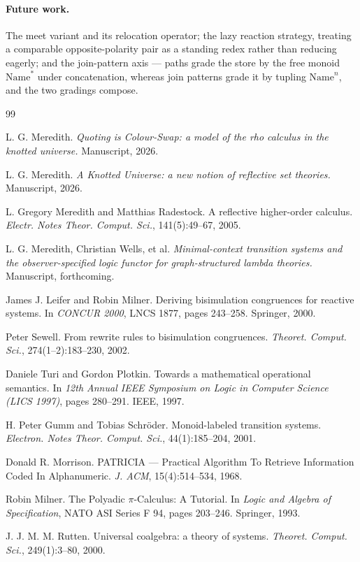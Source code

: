 \documentclass[11pt]{article}
\theoremstyle{plain}
\theoremstyle{definition}
\newcommand{\Name}{\mathrm{Name}}
\begin{document}
\paragraph{Future work.} The meet variant and its relocation operator; the lazy reaction strategy,
treating a comparable opposite-polarity pair as a standing redex rather than reducing eagerly; and the
join-pattern axis --- paths grade the store by the free monoid $\Name^{\ast}$ under concatenation,
whereas join patterns grade it by tupling $\Name^{n}$, and the two gradings compose.

\begin{thebibliography}{99}

 L. G. Meredith. \emph{Quoting is Colour-Swap: a model of the rho calculus in the
knotted universe.} Manuscript, 2026.

 L. G. Meredith. \emph{A Knotted Universe: a new notion of reflective set theories.}
Manuscript, 2026.

 L. Gregory Meredith and Matthias Radestock. A reflective higher-order calculus.
\emph{Electr. Notes Theor. Comput. Sci.}, 141(5):49--67, 2005.

 L. G. Meredith, Christian Wells, et al. \emph{Minimal-context transition systems and
the observer-specified logic functor for graph-structured lambda theories.} Manuscript, forthcoming.

 James J. Leifer and Robin Milner. Deriving bisimulation congruences for reactive
systems. In \emph{CONCUR 2000}, LNCS 1877, pages 243--258. Springer, 2000.

 Peter Sewell. From rewrite rules to bisimulation congruences. \emph{Theoret.
Comput. Sci.}, 274(1--2):183--230, 2002.

 Daniele Turi and Gordon Plotkin. Towards a mathematical operational semantics. In
\emph{12th Annual IEEE Symposium on Logic in Computer Science (LICS 1997)}, pages 280--291. IEEE,
1997.

 H. Peter Gumm and Tobias Schr\"oder. Monoid-labeled transition systems. \emph{Electron.
Notes Theor. Comput. Sci.}, 44(1):185--204, 2001.

 Donald R. Morrison. PATRICIA --- Practical Algorithm To Retrieve Information
Coded In Alphanumeric. \emph{J. ACM}, 15(4):514--534, 1968.

 Robin Milner. The Polyadic $\pi$-Calculus: A Tutorial. In \emph{Logic and Algebra
of Specification}, NATO ASI Series F 94, pages 203--246. Springer, 1993.

 J. J. M. M. Rutten. Universal coalgebra: a theory of systems. \emph{Theoret.
Comput. Sci.}, 249(1):3--80, 2000.

\end{thebibliography}
\end{document}
